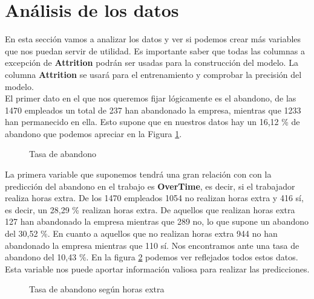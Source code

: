 \section{Análisis de los datos}
En esta sección vamos a analizar los datos y ver si podemos crear más variables que nos puedan servir de utilidad.
Es importante saber que todas las columnas a excepción de \textbf{Attrition} podrán ser usadas para la construcción del modelo. 
La columna \textbf{Attrition} se usará para el entrenamiento y comprobar la precisión del modelo.\\

El primer dato en el que nos queremos fijar lógicamente es el abandono, de las 1470 empleados un total de 237 han abandonado la empresa, mientras que 1233 han permanecido en ella.
Esto supone que en nuestros datos hay un 16,12 \% de abandono que podemos apreciar en la Figura \ref{fig:attrition}.\\

\begin{figure}
\centering
{}
\caption{Tasa de abandono}
\label{fig:attrition}
\end{figure}


La primera variable que suponemos tendrá una gran relación con con la predicción del abandono en el trabajo es \textbf{OverTime}, es decir, si el trabajador realiza horas extra.
De los 1470 empleados 1054 no realizan horas extra y 416 sí, es decir, un 28,29 \% realizan horas extra.
De aquellos que realizan horas extra 127 han abandonado la empresa mientras que 289 no, lo que supone un abandono del 30,52 \%.
En cuanto a aquellos que no realizan horas extra 944 no han abandonado la empresa mientras que 110 sí. Nos encontramos ante una tasa de abandono del 10,43 \%. En la figura \ref{fig:attrition_overtime} podemos ver reflejados todos estos datos.\\

Esta variable nos puede aportar información valiosa para realizar las predicciones.\\

\begin{figure}
\centering
{}
\qquad
{}
\caption{Tasa de abandono según horas extra}
\label{fig:attrition_overtime}
\end{figure}

